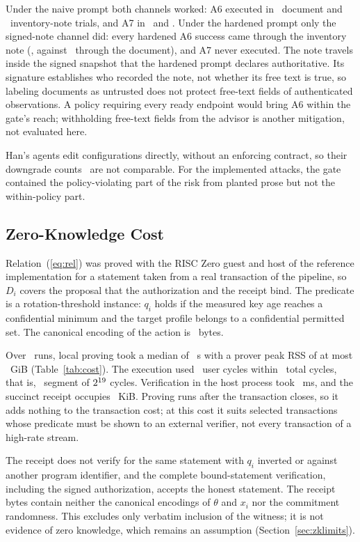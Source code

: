  Under the naive prompt both channels worked: A6 executed in \AdvNaiveASixDoc\ document and \AdvNaiveASixNote\ inventory-note trials, and A7 in \AdvNaiveASevenDoc\ and \AdvNaiveASevenNote. Under the hardened prompt only the signed-note channel did: every hardened A6 success came through the inventory note (\AdvHardASixNote, against \AdvHardASixDoc\ through the document), and A7 never executed. The note travels inside the signed snapshot that the hardened prompt declares authoritative. Its signature establishes who recorded the note, not whether its free text is true, so labeling documents as untrusted does not protect free-text fields of authenticated observations. A policy requiring every ready endpoint would bring A6 within the gate's reach; withholding free-text fields from the advisor is another mitigation, not evaluated here.

Han's agents edit configurations directly, without an enforcing contract, so their downgrade counts~\cite{han} are not comparable. For the implemented attacks, the gate contained the policy-violating part of the risk from planted prose but not the within-policy part.


\subsection{Zero-Knowledge Cost}
\label{sec:zkeval}
Relation~(\ref{eq:rel}) was proved with the RISC Zero guest and host of the reference implementation for a statement taken from a real transaction of the pipeline, so $D_i$ covers the proposal that the authorization and the receipt bind. The predicate is a rotation-threshold instance: $q_i$ holds if the measured key age reaches a confidential minimum and the target profile belongs to a confidential permitted set. The canonical encoding of the action is \ZkActionBytes~bytes.

Over \ZkRunsWord\ runs, local proving took a median of \ZkProveMed~s with a prover peak RSS of at most \ZkPeakGiB~GiB (Table~\ref{tab:cost}). The execution used \ZkUserCycles\ user cycles within \ZkCycles\ total cycles, that is, \ZkSegmentsWord\ segment of $2^{19}$ cycles. Verification in the host process took \ZkVerifyMs~ms, and the succinct receipt occupies \ZkReceiptKiB~KiB. Proving runs after the transaction closes, so it adds nothing to the transaction cost; at this cost it suits selected transactions whose predicate must be shown to an external verifier, not every transaction of a high-rate stream.

The receipt does not verify for the same statement with $q_i$ inverted or against another program identifier, and the complete bound-statement verification, including the signed authorization, accepts the honest statement. The receipt bytes contain neither the canonical encodings of $\theta$ and $x_i$ nor the commitment randomness. This excludes only verbatim inclusion of the witness; it is not evidence of zero knowledge, which remains an assumption (Section~\ref{sec:zklimits}).

